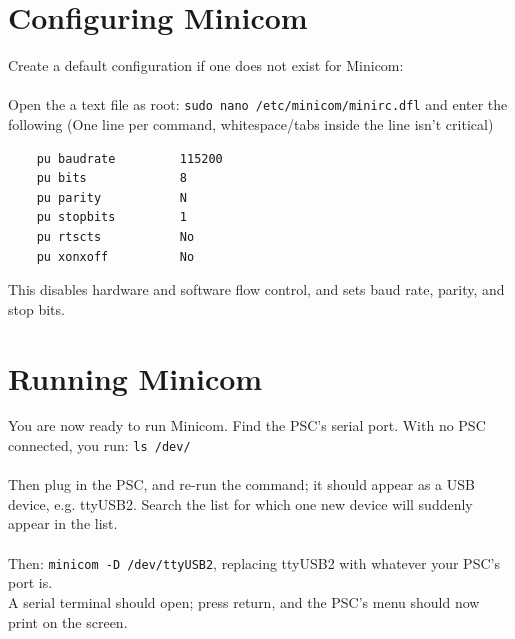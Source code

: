 \section{Configuring Minicom}
Create a default configuration if one does not exist for Minicom:\\\\
Open the a text file as root: \texttt{sudo nano /etc/minicom/minirc.dfl} and enter the following (One line per command, whitespace/tabs inside the line isn't critical)
\begin{verbatim}
	pu baudrate         115200
	pu bits             8
	pu parity           N
	pu stopbits         1
	pu rtscts           No
	pu xonxoff          No
\end{verbatim}
This disables hardware and software flow control, and sets baud rate, parity, and stop bits.

\section{Running Minicom}
You are now ready to run Minicom. Find the PSC's serial port. With no PSC connected, you run: 
\texttt{ls /dev/}\\\\
Then plug in the PSC, and re-run the command; it should appear as a USB device, e.g. ttyUSB2. Search the list for which one new device will suddenly appear in the list.\\\\
Then: \texttt{minicom -D /dev/ttyUSB2}, replacing ttyUSB2 with whatever your PSC's port is.\\
A serial terminal should open; press return, and the PSC's menu should now print on the screen.